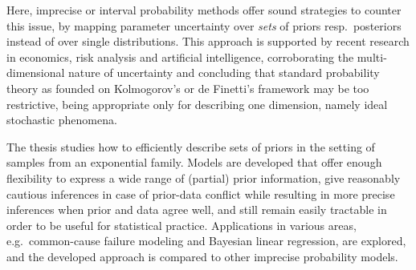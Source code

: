 Here, imprecise or interval probability methods offer sound strategies to counter this issue,
by mapping parameter uncertainty over \emph{sets} of priors resp.\ posteriors instead of over single distributions.
This approach is supported by recent research in economics, risk analysis and artificial intelligence,
corroborating the multi-dimensional nature of uncertainty and concluding that standard probability theory
as founded on Kolmogorov's or de Finetti's framework may be too restrictive,
being appropriate only for describing one dimension, namely ideal stochastic phenomena.

The thesis studies how to efficiently describe sets of priors in the setting of samples from an exponential family. 
Models are developed that offer enough flexibility to express a wide range of (partial) prior information,
give reasonably cautious inferences in case of prior-data conflict while resulting in more precise inferences when prior and data agree well,
and still remain easily tractable in order to be useful for statistical practice.
Applications in various areas, e.g.\ common-cause failure modeling and Bayesian linear regression, are explored,
and the developed approach is compared to other imprecise probability models.

